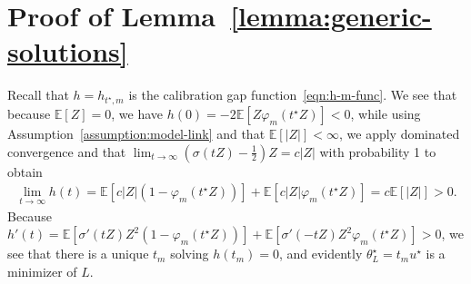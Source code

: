 \documentclass[11pt]{article}
\newcommand{\Ep}{\mathbb{E}}
\newcommand{\E}{\mathbb{E}}
\newcommand{\Prb}{\mathbb{P}}
\newcommand{\prn}[1]{\left({#1}\right)} %
\newcommand{\norm}[1]{\left\|{#1}\right\|} %
\newcommand{\loss}{\ell}
\newcommand{\poploss}{L}
\newcommand{\ltwo}[1]{\norm{#1}_2} %
\newcommand{\<}{\langle} %
\renewcommand{\>}{\rangle}
\newcommand{\half}{\frac{1}{2}}
\newcommand{\opt}{^\star}
\begin{document}


\section{Proof of Lemma~\ref{lemma:generic-solutions}}
\label{sec:proof-generic-solutions}

Recall that $h = h_{t\opt, m}$ is the calibration
gap function~\eqref{eqn:h-m-func}.
We see that because $\E[Z] = 0$, we have
$h(0) = -2 \E[Z \varphi_m(t\opt Z)] < 0$,
while using Assumption~\ref{assumption:model-link} and that
$\E[|Z|] < \infty$, we apply dominated convergence and that
$\lim_{t \to \infty} (\sigma(t Z) - \half) Z = c|Z|$ with probability 1
to obtain
\begin{align*}
	\lim_{t \to \infty} h(t) = \E[c|Z| (1 - \varphi_m(t\opt Z))]
	+ \E[c |Z| \varphi_m(t\opt Z)] = c \E[|Z|] > 0.
\end{align*}
Because $h'(t) = \E[\sigma'(tZ) Z^2 (1 - \varphi_m(t\opt Z))]
+ \E[\sigma'(-tZ) Z^2 \varphi_m(t\opt Z)] > 0$, we see that there
is a unique $t_m$ solving $h(t_m) = 0$, and evidently
$\theta\opt_L = t_m u\opt$ is a minimizer of $L$.
\end{document}
